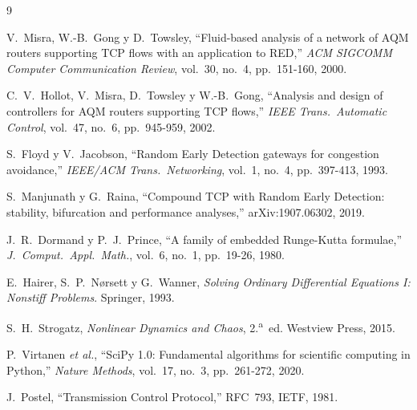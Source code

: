 \documentclass[10pt,a4paper]{article}
\begin{document}
\begin{thebibliography}{9}
\small

V.~Misra, W.-B.~Gong y D.~Towsley,
``Fluid-based analysis of a network of AQM routers supporting TCP flows with an application to RED,''
\textit{ACM SIGCOMM Computer Communication Review}, vol.~30, no.~4, pp.~151-160, 2000.

C.~V.~Hollot, V.~Misra, D.~Towsley y W.-B.~Gong,
``Analysis and design of controllers for AQM routers supporting TCP flows,''
\textit{IEEE Trans.\ Automatic Control}, vol.~47, no.~6, pp.~945-959, 2002.

S.~Floyd y V.~Jacobson,
``Random Early Detection gateways for congestion avoidance,''
\textit{IEEE/ACM Trans.\ Networking}, vol.~1, no.~4, pp.~397-413, 1993.

S.~Manjunath y G.~Raina,
``Compound TCP with Random Early Detection: stability, bifurcation and performance analyses,''
arXiv:1907.06302, 2019.

J.~R.~Dormand y P.~J.~Prince,
``A family of embedded Runge-Kutta formulae,''
\textit{J.\ Comput.\ Appl.\ Math.}, vol.~6, no.~1, pp.~19-26, 1980.

E.~Hairer, S.~P.~Nørsett y G.~Wanner,
\textit{Solving Ordinary Differential Equations I: Nonstiff Problems}.
Springer, 1993.

S.~H.~Strogatz,
\textit{Nonlinear Dynamics and Chaos}, 2.\textsuperscript{a}~ed.
Westview Press, 2015.

P.~Virtanen \textit{et al.},
``SciPy 1.0: Fundamental algorithms for scientific computing in Python,''
\textit{Nature Methods}, vol.~17, no.~3, pp.~261-272, 2020.

J.~Postel,
``Transmission Control Protocol,''
RFC~793, IETF, 1981.

\end{thebibliography}
\end{document}
